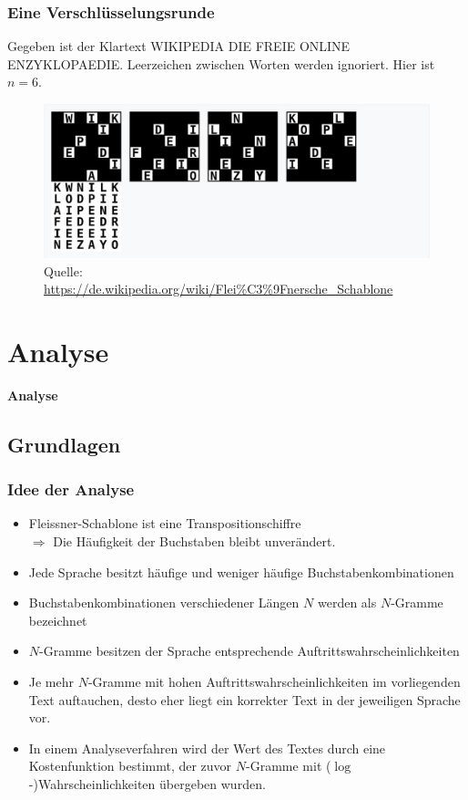 \documentclass{beamer}
\begin{document}
\begin{frame} 
\frametitle{Eine Verschlüsselungsrunde} 
Gegeben ist der Klartext \glqq WIKIPEDIA DIE FREIE ONLINE ENZYKLOPAEDIE\grqq{}. Leerzeichen zwischen Worten werden ignoriert. Hier ist $n=6$.
\begin{figure}
\includegraphics[scale=0.4]{WikiVerschluesselung.jpg}
\caption{Quelle: \url{https://de.wikipedia.org/wiki/Flei\%C3\%9Fnersche_Schablone}}
\end{figure}
\end{frame}

\section{Analyse} 
\begin{frame}
\begin{center}
\textbf{\huge Analyse}
\end{center}
\end{frame}

\subsection{Grundlagen}
\begin{frame}\frametitle{Idee der Analyse}
\begin{itemize}
\item Fleissner-Schablone ist eine Transpositionschiffre \\
$\Rightarrow$ Die Häufigkeit der Buchstaben bleibt unverändert.%
\item Jede Sprache besitzt häufige und weniger häufige Buchstabenkombinationen%
\item Buchstabenkombinationen verschiedener Längen $N$ werden als \glqq $N$-Gramme\grqq{} bezeichnet %
\item $N$-Gramme besitzen der Sprache entsprechende Auftrittswahrscheinlichkeiten%
\item Je mehr $N$-Gramme mit hohen Auftrittswahrscheinlichkeiten im vorliegenden Text auftauchen, desto eher liegt ein korrekter Text in der jeweiligen Sprache vor.%
\item In einem Analyseverfahren wird der \glqq Wert\grqq{} des Textes durch eine Kostenfunktion bestimmt, der zuvor $N$-Gramme mit ($\log$-)Wahrscheinlichkeiten übergeben wurden.
\end{itemize}
\end{frame}
\end{document}
